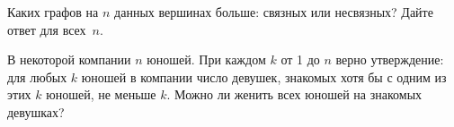 \documentclass[a4paper,11pt]{article}
\begin{document}
\thispagestyle{empty}














Каких графов на $n$ данных вершинах больше: связных или несвязных?
Дайте ответ для всех~$n$.




 В некоторой компании $n$ юношей.
При каждом $k$ от 1 до $n$ верно утверждение:
для любых $k$ юношей в компании число девушек,
знакомых хотя бы с одним из этих $k$ юношей, не меньше $k$.
Можно ли женить всех юношей на знакомых девушках?
\end{document}
